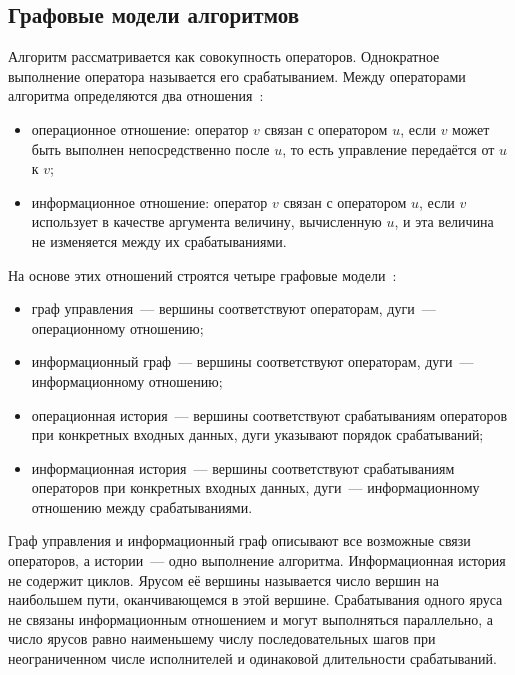 \subsection{Графовые модели алгоритмов}

Алгоритм рассматривается как совокупность операторов. Однократное выполнение
оператора называется его срабатыванием. Между операторами алгоритма определяются
два отношения~\cite{voevodin}:
\begin{itemize}
    \item операционное отношение: оператор $v$ связан с оператором $u$, если $v$
    может быть выполнен непосредственно после $u$, то есть управление
    передаётся от $u$ к $v$;
    \item информационное отношение: оператор $v$ связан с оператором $u$, если $v$
    использует в качестве аргумента величину, вычисленную $u$, и эта величина
    не изменяется между их срабатываниями.
\end{itemize}

На основе этих отношений строятся четыре графовые модели~\cite{voevodin}:
\begin{itemize}
    \item граф управления~--- вершины соответствуют операторам, дуги~---
    операционному отношению;
    \item информационный граф~--- вершины соответствуют операторам, дуги~---
    информационному отношению;
    \item операционная история~--- вершины соответствуют срабатываниям операторов
    при конкретных входных данных, дуги указывают порядок срабатываний;
    \item информационная история~--- вершины соответствуют срабатываниям
    операторов при конкретных входных данных, дуги~--- информационному отношению
    между срабатываниями.
\end{itemize}

Граф управления и информационный граф описывают все возможные связи
операторов, а истории~--- одно выполнение алгоритма. Информационная история
не содержит циклов. Ярусом её вершины называется число вершин на наибольшем
пути, оканчивающемся в этой вершине. Срабатывания одного яруса не связаны
информационным отношением и могут выполняться параллельно, а число ярусов
равно наименьшему числу последовательных шагов при неограниченном числе
исполнителей и одинаковой длительности срабатываний.
